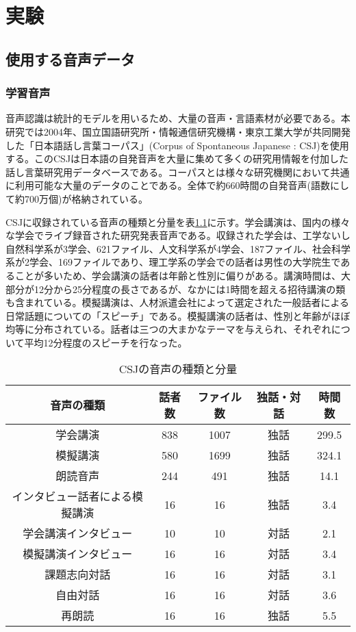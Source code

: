 \chapter{実験}
\section{使用する音声データ}
\label{section:test_audio}
\subsection{学習音声}
\par
音声認識は統計的モデルを用いるため、大量の音声・言語素材が必要である。本研究では2004年、国立国語研究所・情報通信研究機構・東京工業大学が共同開発した「日本語話し言葉コーパス」(Corpus of Spontaneous Japanese : CSJ)を使用する。このCSJは日本語の自発音声を大量に集めて多くの研究用情報を付加した話し言葉研究用データベースである。コーパスとは様々な研究機関において共通に利用可能な大量のデータのことである。全体で約660時間の自発音声(語数にして約700万個)が格納されている。\par
CSJに収録されている音声の種類と分量を表\ref{table:detail_csj}に示す。学会講演は、国内の様々な学会でライブ録音された研究発表音声である。収録された学会は、工学ないし自然科学系が3学会、621ファイル、人文科学系が4学会、187ファイル、社会科学系が2学会、169ファイルであり、理工学系の学会での話者は男性の大学院生であることが多いため、学会講演の話者は年齢と性別に偏りがある。講演時間は、大部分が12分から25分程度の長さであるが、なかには1時間を超える招待講演の類も含まれている。模擬講演は、人材派遣会社によって選定された一般話者による日常話題についての「スピーチ」である。模擬講演の話者は、性別と年齢がほぼ均等に分布されている。話者は三つの大まかなテーマを与えられ、それぞれについて平均12分程度のスピーチを行なった。\par

\begin{table}[H]
  \begin{center}
    \caption{CSJの音声の種類と分量 \label{table:detail_csj}}
    \begin{tabular}{|c||c|c|c|c|} \hline
      音声の種類 & 話者数 & ファイル数 & 独話・対話 & 時間数\\ \hline
      学会講演 & 838 & 1007 & 独話 & 299.5 \\ \hline
      模擬講演 & 580 & 1699 & 独話 & 324.1 \\ \hline
      朗読音声 & 244 & 491 & 独話 & 14.1 \\ \hline
      インタビュー話者による模擬講演 & 16 & 16 & 独話 & 3.4 \\ \hline
      学会講演インタビュー & 10 & 10 & 対話 & 2.1 \\ \hline
      模擬講演インタビュー & 16 & 16 & 対話 & 3.4 \\ \hline
      課題志向対話 & 16 & 16 & 対話 & 3.1 \\ \hline
      自由対話 & 16 & 16 & 対話 & 3.6 \\ \hline
      再朗読 & 16 & 16 & 独話 & 5.5\\ \hline
    \end{tabular}
  \end{center}
\end{table}

